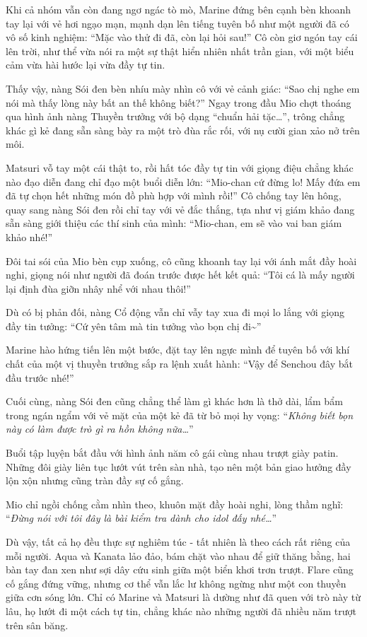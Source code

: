 \documentclass[../main.tex]{subfiles}
\begin{document}
Khi cả nhóm vẫn còn đang ngơ ngác tò mò, Marine đứng bên cạnh bèn khoanh tay lại với vẻ hơi ngạo mạn, mạnh dạn lên tiếng tuyên bố như một người đã có vô số kinh nghiệm: ``Mặc vào thử đi đã, còn lại hỏi sau!'' Cô còn giơ ngón tay cái lên trời, như thể vừa nói ra một sự thật hiển nhiên nhất trần gian, với một biểu cảm vừa hài hước lại vừa đầy tự tin.

Thấy vậy, nàng Sói đen bèn nhíu mày nhìn cô với vẻ cảnh giác: ``Sao chị nghe em nói mà thấy lòng này bất an thế không biết?'' Ngay trong đầu Mio chợt thoáng qua hình ảnh nàng Thuyền trưởng với bộ dạng ``chuẩn hải tặc\dots'', trông chẳng khác gì kẻ đang sẵn sàng bày ra một trò đùa rắc rối, với nụ cười gian xảo nở trên môi.

Matsuri vỗ tay một cái thật to, rồi hất tóc đầy tự tin với giọng điệu chẳng khác nào đạo diễn đang chỉ đạo một buổi diễn lớn: ``Mio-chan cứ đừng lo! Mấy đứa em đã tự chọn hết những món đồ phù hợp với mình rồi!'' Cô chống tay lên hông, quay sang nàng Sói đen rồi chỉ tay với vẻ đắc thắng, tựa như vị giám khảo đang sẵn sàng giới thiệu các thí sinh của mình: ``Mio-chan, em sẽ vào vai ban giám khảo nhé!''

Đôi tai sói của Mio bèn cụp xuống, cô cũng khoanh tay lại với ánh mắt đầy hoài nghi, giọng nói như người đã đoán trước được hết kết quả: ``Tôi cá là mấy người lại định đùa giỡn nhây nhể với nhau thôi!''

Dù có bị phản đối, nàng Cổ động vẫn chỉ vẫy tay xua đi mọi lo lắng với giọng đầy tin tưởng: ``Cứ yên tâm mà tin tưởng vào bọn chị đi\~{}''

Marine hào hứng tiến lên một bước, đặt tay lên ngực mình để tuyên bố với khí chất của một vị thuyền trưởng sắp ra lệnh xuất hành: ``Vậy để Senchou đây bắt đầu trước nhé!''

Cuối cùng, nàng Sói đen cũng chẳng thể làm gì khác hơn là thở dài, lẩm bẩm trong ngán ngẩm với vẻ mặt của một kẻ đã từ bỏ mọi hy vọng: ``\textit{Không biết bọn này có làm được trò gì ra hồn không nữa\dots}''

\ct

Buổi tập luyện bắt đầu với hình ảnh năm cô gái cùng nhau trượt giày patin. Những đôi giày liên tục lướt vút trên sàn nhà, tạo nên một bản giao hưởng đầy lộn xộn nhưng cũng tràn đầy sự cố gắng.

Mio chỉ ngồi chống cằm nhìn theo, khuôn mặt đầy hoài nghi, lòng thầm nghĩ: ``\textit{Đừng nói với tôi đây là bài kiểm tra dành cho idol đấy nhé\dots}''

Dù vậy, tất cả họ đều thực sự nghiêm túc - tất nhiên là theo cách rất riêng của mỗi người. Aqua và Kanata lảo đảo, bám chặt vào nhau để giữ thăng bằng, hai bàn tay đan xen như sợi dây cứu sinh giữa một biển khơi trơn trượt. Flare cũng cố gắng đứng vững, nhưng cơ thể vẫn lắc lư không ngừng như một con thuyền giữa cơn sóng lớn. Chỉ có Marine và Matsuri là dường như đã quen với trò này từ lâu, họ lướt đi một cách tự tin, chẳng khác nào những người đã nhiều năm trượt trên sân băng.
\end{document}
